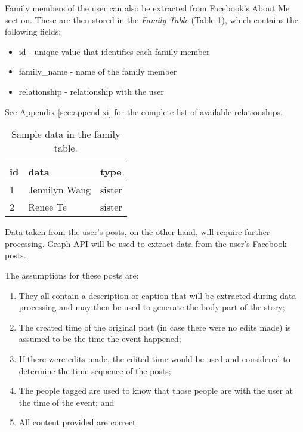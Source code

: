 Family members of the user can also be extracted from Facebook's About Me section. These are then stored in the \textit{Family Table} (Table \ref{tab:Family}), which contains the following fields:
\begin{itemize}
\item id - unique value that identifies each family member
\item family\_name - name of the family member
\item relationship - relationship with the user
\end{itemize}
See Appendix \ref{sec:appendixi} for the complete list of available relationships.

\begin{table}[ph!]   %
\centering
\caption{Sample data in the family table.} \vspace{0.25em}
\begin{tabular}{|p{1.5cm}|p{2in}|p{1.5in}|} \hline
\textbf{id} & \textbf{data} & \textbf{type} \\ \hline
1 & Jennilyn Wang & sister \\ \hline
2 & Renee Te & sister \\ \hline
\end{tabular}
\label{tab:Family}
\end{table}

Data taken from the user's posts, on the other hand, will require further processing. Graph API will be used to extract data from the user's Facebook posts.

The assumptions for these posts are:
\begin{enumerate} [label=\alph*.]
\item They all contain a description or caption that will be extracted during data processing and may then be used to generate the body part of the story; 
\item The created time of the original post (in case there were no edits made) is assumed to be the time the event happened;
\item If there were edits made, the edited time would be used and considered to determine the time sequence of the posts;
\item The people tagged are used to know that those people are with the user at the time of the event; and
\item All content provided are correct.

\end{enumerate}


